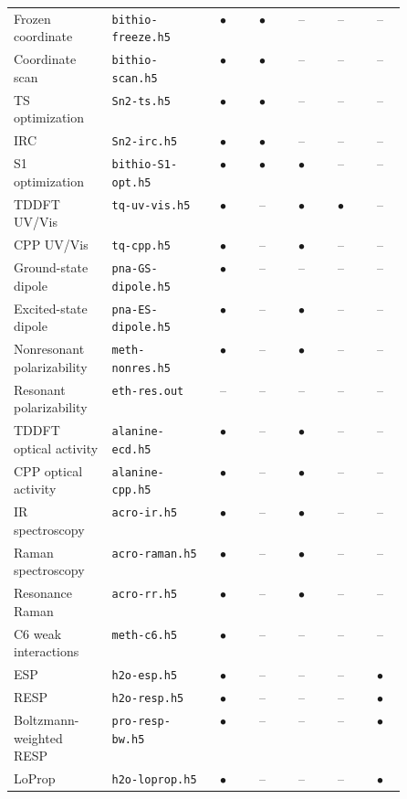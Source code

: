 \documentclass[journal=jacsat,manuscript=suppinfo]{achemso}
\begin{document}
\begin{landscape}
{\begin{longtable}{p{0.25\linewidth}p{0.25\linewidth}ccccc}
Frozen coordinate & \texttt{bithio-freeze.h5} & \(\bullet\) & \(\bullet\) & -- & -- & -- \\
Coordinate scan & \texttt{bithio-scan.h5} & \(\bullet\) & \(\bullet\) & -- & -- & -- \\
TS optimization & \texttt{Sn2-ts.h5} & \(\bullet\) & \(\bullet\) & -- & -- & -- \\
IRC & \texttt{Sn2-irc.h5} & \(\bullet\) & \(\bullet\) & -- & -- & -- \\
S1 optimization & \texttt{bithio-S1-opt.h5} & \(\bullet\) & \(\bullet\) & \(\bullet\) & -- & -- \\
TDDFT UV/Vis & \texttt{tq-uv-vis.h5} & \(\bullet\) & -- & \(\bullet\) & \(\bullet\) & -- \\
CPP UV/Vis & \texttt{tq-cpp.h5} & \(\bullet\) & -- & \(\bullet\) & -- & -- \\
Ground-state dipole & \texttt{pna-GS-dipole.h5} & \(\bullet\) & -- & -- & -- & -- \\
Excited-state dipole & \texttt{pna-ES-dipole.h5} & \(\bullet\) & -- & \(\bullet\) & -- & -- \\
Nonresonant polarizability & \texttt{meth-nonres.h5} & \(\bullet\) & -- & \(\bullet\) & -- & -- \\
Resonant polarizability & \texttt{eth-res.out} & -- & -- & -- & -- & -- \\
TDDFT optical activity & \texttt{alanine-ecd.h5} & \(\bullet\) & -- & \(\bullet\) & -- & -- \\
CPP optical activity & \texttt{alanine-cpp.h5} & \(\bullet\) & -- & \(\bullet\) & -- & -- \\
IR spectroscopy & \texttt{acro-ir.h5} & \(\bullet\) & -- & \(\bullet\) & -- & -- \\
Raman spectroscopy & \texttt{acro-raman.h5} & \(\bullet\) & -- & \(\bullet\) & -- & -- \\
Resonance Raman & \texttt{acro-rr.h5} & \(\bullet\) & -- & \(\bullet\) & -- & -- \\
C6 weak interactions & \texttt{meth-c6.h5} & \(\bullet\) & -- & -- & -- & -- \\
ESP & \texttt{h2o-esp.h5} & \(\bullet\) & -- & -- & -- & \(\bullet\) \\
RESP & \texttt{h2o-resp.h5} & \(\bullet\) & -- & -- & -- & \(\bullet\) \\
Boltzmann-weighted RESP & \texttt{pro-resp-bw.h5} & \(\bullet\) & -- & -- & -- & \(\bullet\) \\
LoProp & \texttt{h2o-loprop.h5} & \(\bullet\) & -- & -- & -- & \(\bullet\) \\

\end{longtable}}
\end{landscape}
\end{document}

